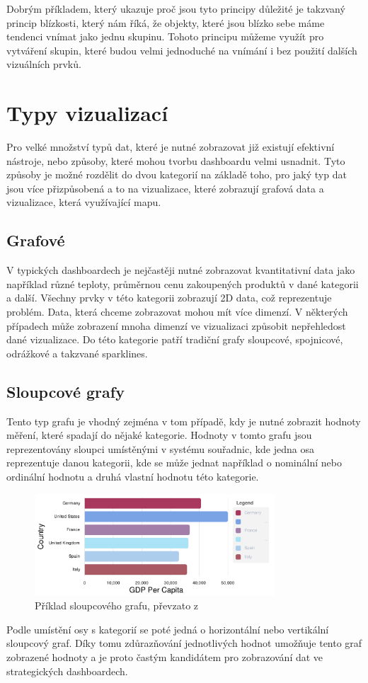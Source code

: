 Dobrým příkladem, který ukazuje proč jsou tyto principy důležité je takzvaný princip blízkosti, který nám říká, že objekty, které jsou blízko sebe máme tendenci vnímat jako jednu skupinu. Tohoto principu můžeme využít pro vytváření skupin, které budou velmi jednoduché na vnímání i bez použití dalších vizuálních prvků.

\section{Typy vizualizací}
Pro velké množství typů dat, které je nutné zobrazovat již existují efektivní nástroje, nebo způsoby, které mohou tvorbu dashboardu velmi usnadnit. Tyto způsoby je možné rozdělit do dvou kategorií na základě toho, pro jaký typ dat jsou více přizpůsobená a to na vizualizace, které zobrazují grafová data a vizualizace, která využívající mapu.

\subsection{Grafové}
V typických dashboardech je nejčastěji nutné zobrazovat kvantitativní data jako například různé teploty, průměrnou cenu zakoupených produktů v dané kategorii a další. Všechny prvky v této kategorii zobrazují 2D data, což reprezentuje problém. Data, která chceme zobrazovat mohou mít více dimenzí. V některých případech může zobrazení mnoha dimenzí ve vizualizaci způsobit nepřehledost dané vizualizace. Do této kategorie patří tradiční grafy sloupcové, spojnicové, odrážkové a takzvané sparklines.

\subsection*{Sloupcové grafy}
Tento typ grafu je vhodný zejména v tom případě, kdy je nutné zobrazit hodnoty měření, které spadají do nějaké kategorie. Hodnoty v tomto grafu jsou reprezentovány sloupci umístěnými v systému souřadnic, kde jedna osa reprezentuje danou kategorii, kde se může jednat například o nominální nebo ordinální hodnotu a druhá vlastní hodnotu této kategorie.
\begin{figure}[H]
\label{question4}
\begin{center}
    \includegraphics[width=0.8\textwidth]{obrazky-figures/bar.pdf}
\end{center}
\caption{Příklad sloupcového grafu, převzato z \protect\footnotemark}
\end{figure}
Podle umístění osy s kategorií se poté jedná o horizontální nebo vertikální sloupcový graf. Díky tomu zdůrazňování jednotlivých hodnot umožňuje tento graf zobrazené hodnoty a je proto častým kandidátem pro zobrazování dat ve strategických dashboardech.
